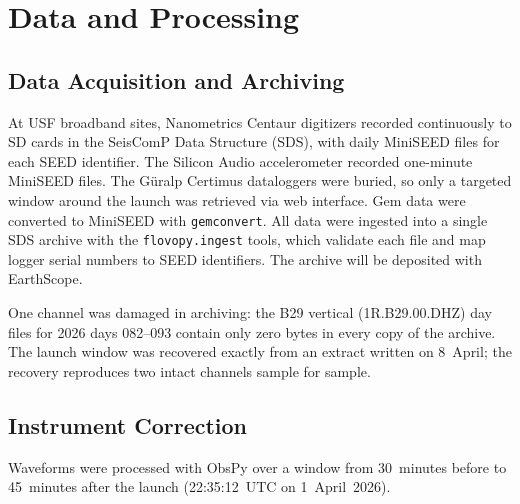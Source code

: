 \documentclass[]{seismica}
\begin{document}
\section{Data and Processing}

\subsection{Data Acquisition and Archiving}
\label{sec:instruments}

At USF broadband sites, Nanometrics Centaur digitizers recorded
continuously to SD cards in the SeisComP Data Structure (SDS), with
daily MiniSEED files for each SEED identifier. The Silicon Audio
accelerometer recorded one-minute MiniSEED files. The G\"{u}ralp
Certimus dataloggers were buried, so only a targeted window around the
launch was retrieved via web interface. Gem data were converted to
MiniSEED with \texttt{gemconvert}. All data were ingested into a single
SDS archive with the \texttt{flovopy.ingest} tools, which validate
each file and map logger serial numbers to SEED identifiers. The archive
will be deposited with EarthScope.

One channel was damaged in archiving: the B29 vertical (1R.B29.00.DHZ)
day files for 2026 days 082--093 contain only zero bytes in every copy
of the archive. The launch window was recovered exactly from an extract
written on 8~April; the recovery reproduces two intact channels sample
for sample.

\subsection{Instrument Correction}
\label{sec:response}

Waveforms were processed with ObsPy \citep{Beyreuther2010} over a window
from 30~minutes before to 45~minutes after the launch (22:35:12~UTC on
1~April~2026).
\end{document}
